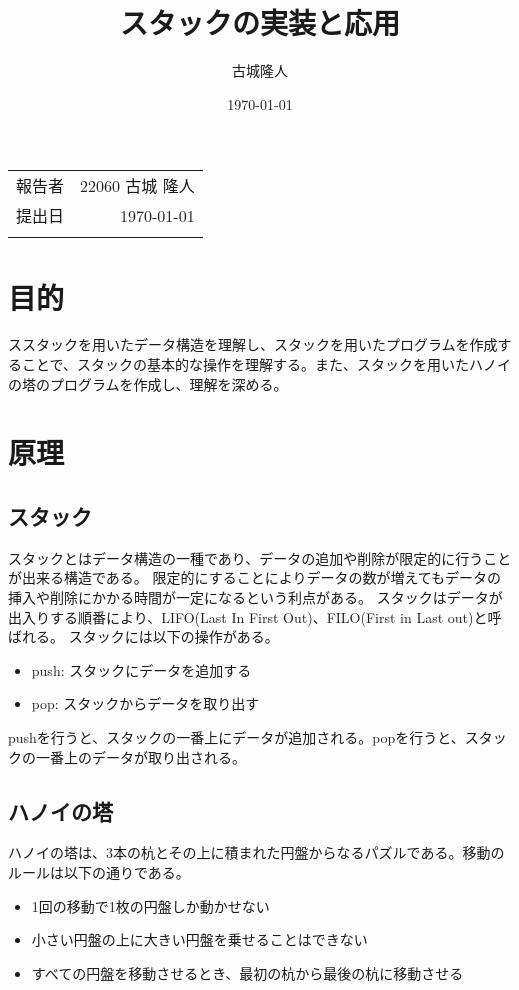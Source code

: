 \documentclass[a4paper,11pt]{jsarticle}
\begin{document}
\title{スタックの実装と応用}
\author{古城隆人}
\date{\today}
\maketitle

\begin{table}[b]
  \centering
  \begin{tabular}{:c:r:}
    \hdashline
    報告者 & 22060 古城 隆人 \\
    \hdashline
    提出日 & \today \\
    \hdashline
  \end{tabular}
\end{table}

\tableofcontents

\newpage


\section{目的}
ススタックを用いたデータ構造を理解し、スタックを用いたプログラムを作成することで、スタックの基本的な操作を理解する。また、スタックを用いたハノイの塔のプログラムを作成し、理解を深める。
\section{原理}
\subsection{スタック}
スタックとはデータ構造の一種であり、データの追加や削除が限定的に行うことが出来る構造である。
限定的にすることによりデータの数が増えてもデータの挿入や削除にかかる時間が一定になるという利点がある。
スタックはデータが出入りする順番により、LIFO(Last In First Out)、FILO(First in Last out)と呼ばれる。
スタックには以下の操作がある。
\begin{itemize}
  \item push: スタックにデータを追加する
  \item pop: スタックからデータを取り出す
\end{itemize}
pushを行うと、スタックの一番上にデータが追加される。popを行うと、スタックの一番上のデータが取り出される。
\subsection{ハノイの塔}
ハノイの塔は、3本の杭とその上に積まれた円盤からなるパズルである。移動のルールは以下の通りである。
\begin{itemize}
  \item 1回の移動で1枚の円盤しか動かせない
  \item 小さい円盤の上に大きい円盤を乗せることはできない
  \item すべての円盤を移動させるとき、最初の杭から最後の杭に移動させる
\end{itemize}
\end{document}
